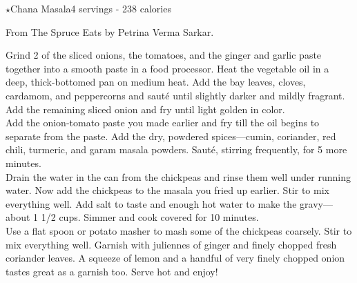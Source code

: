 \begin{recipe}{\texorpdfstring{$\star$}{str}Chana Masala}{4 servings - 238 calories}{}

\freeform From The Spruce Eats by Petrina Verma Sarkar.


Grind 2 of the sliced onions, the tomatoes, and the ginger and garlic paste together into a smooth paste in a food processor. Heat the vegetable oil in a deep, thick-bottomed pan on medium heat. Add the bay leaves, cloves, cardamom, and peppercorns and sauté until slightly darker and mildly fragrant. Add the remaining sliced onion and fry until light golden in color.\\

Add the onion-tomato paste you made earlier and fry till the oil begins to separate from the paste. Add the dry, powdered spices—cumin, coriander, red chili, turmeric, and garam masala powders. Sauté, stirring frequently, for 5 more minutes.\\

Drain the water in the can from the chickpeas and rinse them well under running water. Now add the chickpeas to the masala you fried up earlier. Stir to mix everything well. Add salt to taste and enough hot water to make the gravy—about 1 1/2 cups. Simmer and cook covered for 10 minutes.\\

Use a flat spoon or potato masher to mash some of the chickpeas coarsely. Stir to mix everything well. Garnish with juliennes of ginger and finely chopped fresh coriander leaves. A squeeze of lemon and a handful of very finely chopped onion tastes great as a garnish too. Serve hot and enjoy!

\end{recipe}